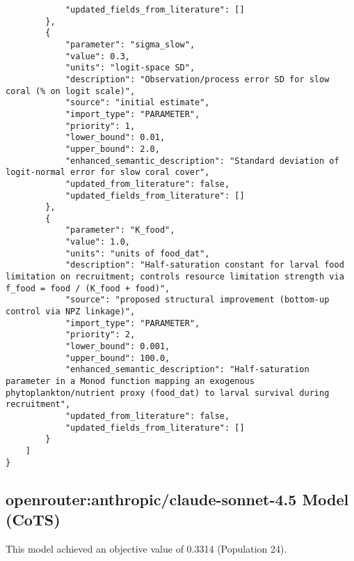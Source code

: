 \begin{lstlisting}
            "updated_fields_from_literature": []
        },
        {
            "parameter": "sigma_slow",
            "value": 0.3,
            "units": "logit-space SD",
            "description": "Observation/process error SD for slow coral (% on logit scale)",
            "source": "initial estimate",
            "import_type": "PARAMETER",
            "priority": 1,
            "lower_bound": 0.01,
            "upper_bound": 2.0,
            "enhanced_semantic_description": "Standard deviation of logit-normal error for slow coral cover",
            "updated_from_literature": false,
            "updated_fields_from_literature": []
        },
        {
            "parameter": "K_food",
            "value": 1.0,
            "units": "units of food_dat",
            "description": "Half-saturation constant for larval food limitation on recruitment; controls resource limitation strength via f_food = food / (K_food + food)",
            "source": "proposed structural improvement (bottom-up control via NPZ linkage)",
            "import_type": "PARAMETER",
            "priority": 2,
            "lower_bound": 0.001,
            "upper_bound": 100.0,
            "enhanced_semantic_description": "Half-saturation parameter in a Monod function mapping an exogenous phytoplankton/nutrient proxy (food_dat) to larval survival during recruitment",
            "updated_from_literature": false,
            "updated_fields_from_literature": []
        }
    ]
}
\end{lstlisting}
\clearpage
\subsection{openrouter:anthropic/claude-sonnet-4.5 Model (CoTS)}
This model achieved an objective value of 0.3314 (Population 24).

